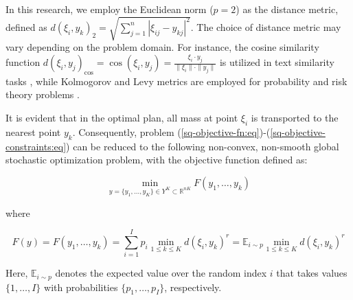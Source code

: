 In this research, we employ the Euclidean norm ($p = 2$) as the distance metric, defined as $ d(\xi_i, y_k)_2 = \sqrt{\sum_{j=1}^n | \xi_{ij} - y_{kj} |^2} $. The choice of distance metric may vary depending on the problem domain. For instance, the cosine similarity function $ d(\xi_i, y_j)_{\text{cos}} = \cos(\xi_i, y_j) = \frac{\xi_i \cdot y_j}{\| \xi_i \| \cdot \| y_j \|} $ is utilized in text similarity tasks \cite{Babic_2020,vor_der_bruck_pouly_2019}, while Kolmogorov and Levy metrics are employed for probability and risk theory problems \cite{Kuzmenko_Uryasev_2019}.

It is evident that in the optimal plan, all mass at point $\xi_i$ is transported to the nearest point $y_k$. Consequently, problem (\ref{sq-objective-fn:eq})-(\ref{sq-objective-constraints:eq}) can be reduced to the following non-convex, non-smooth global stochastic optimization problem, with the objective function defined as:

\begin{equation}
    \label{global-sq-objective-fn:eq}
        \min_{y = \{ y_1, \ldots, y_K \} \in Y^K \subset \mathbb{R}^{nK}} F(y_1, \ldots, y_k)
\end{equation}

\noindent where

\begin{equation}
    \label{global-sq-fn-expansion:eq}
        F(y) = F(y_1, \ldots, y_k) = \sum_{i=1}^I p_i \min_{1 \leq k \leq K} d(\xi_i, y_k)^r = \mathbb{E}_{i \sim p} \min_{1 \leq k \leq K} d(\xi_i, y_k)^r
\end{equation}

Here, $\mathbb{E}_{i \sim p}$ denotes the expected value over the random index $i$ that takes values $\{1, \ldots, I\}$ with probabilities $\{p_1, \ldots, p_I\}$, respectively.

